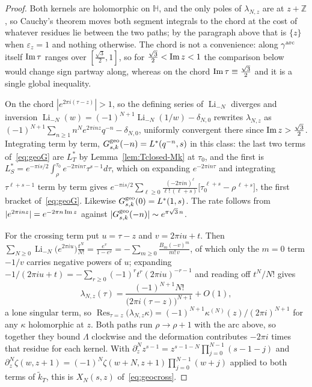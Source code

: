 \documentclass[11pt]{article}
\newcommand{\HH}{\mathbb{H}}
\newcommand{\ZZ}{\mathbb{Z}}
\newcommand{\tk}{\widetilde{k}_T}
\DeclareMathOperator{\Res}{Res}
\DeclareMathOperator{\Li}{Li}
\begin{document}
\begin{proof}
Both kernels are holomorphic on $\HH$, and the only poles of $\lambda_{N,z}$ are at $z+\ZZ$, so
Cauchy's theorem moves both segment integrals to the chord at the cost of whatever residues lie
between the two paths; by the paragraph above that is $\{z\}$ when $\varepsilon_z=1$ and nothing
otherwise. The chord is not a
convenience: along $\gamma^{\rm arc}$ itself ${\rm Im}\,\tau$ ranges over
$[\tfrac{\sqrt3}{2},1]$, so for $\tfrac{\sqrt3}{2}<{\rm Im}\,z<1$ the comparison below would change
sign partway along, whereas on the chord ${\rm Im}\,\tau\equiv\tfrac{\sqrt3}{2}$ and it is a single
global inequality.

On the chord $|e^{2\pi i(\tau-z)}|>1$, so the defining series of $\Li_{-N}$ diverges and inversion
$\Li_{-N}(w)=(-1)^{N+1}\Li_{-N}(1/w)-\delta_{N,0}$ rewrites $\lambda_{N,z}$ as
$(-1)^{N+1}\sum_{n\ge1}n^{N}e^{2\pi inz}q^{-n}-\delta_{N,0}$, uniformly convergent there since
${\rm Im}\,z>\tfrac{\sqrt3}{2}$. Integrating term by term, $G^{\rm geo}_{s,k}(-n)=L^*(q^{-n},s)$ in
this class: the last two terms of~\eqref{eq:geoG} are $L^*_T$ by Lemma~\ref{lem:Tclosed-Mk} at
$\tau_0$, and the first is $L^*_S=e^{-\pi is/2}\int_{\rho}^{\tau_0}e^{-2\pi in\tau}\tau^{s-1}d\tau$,
which on expanding $e^{-2\pi in\tau}$ and integrating $\tau^{\ell+s-1}$ term by term gives
$e^{-\pi is/2}\sum_{\ell\ge0}\frac{(-2\pi in)^{\ell}}{\ell!\,(\ell+s)}
\big[\tau_0^{\,\ell+s}-\rho^{\,\ell+s}\big]$,
the first bracket of~\eqref{eq:geoG}. Likewise $G^{\rm geo}_{s,k}(0)=L^*(1,s)$. The rate follows
from $|e^{2\pi inz}|=e^{-2\pi n\,{\rm Im}\,z}$ against
$|G^{\rm geo}_{s,k}(-n)|\sim e^{\pi\sqrt3\,n}$.

For the crossing term put $u=\tau-z$ and $v=2\pi iu+t$. Then
$\sum_{N\ge0}\Li_{-N}\big(e^{2\pi iu}\big)\tfrac{t^{N}}{N!}=\tfrac{e^{v}}{1-e^{v}}
=-\sum_{m\ge0}\tfrac{B_m(-v)^{m}}{m!\,v}$, of which only the $m=0$ term $-1/v$ carries negative
powers of $u$; expanding $-1/(2\pi iu+t)=-\sum_{r\ge0}(-1)^{r}t^{r}(2\pi iu)^{-r-1}$ and reading
off $t^{N}/N!$ gives
\begin{equation}\label{eq:blockpp}
\lambda_{N,z}(\tau)=\frac{(-1)^{N+1}N!}{\big(2\pi i(\tau-z)\big)^{N+1}}+O(1),
\end{equation}
a lone singular term, so $\Res_{\tau=z}\big(\lambda_{N,z}\kappa\big)
=(-1)^{N+1}\kappa^{(N)}(z)/(2\pi i)^{N+1}$ for any $\kappa$ holomorphic at $z$. Both paths run
$\rho\to\rho+1$ with the arc above, so together they bound $\Lambda$ clockwise and the deformation
contributes $-2\pi i$ times that residue for each kernel. With
$\partial_z^{N}z^{s-1}=z^{s-1-N}\prod_{j=0}^{N-1}(s-1-j)$ and
$\partial_z^{N}\zeta(w,z+1)=(-1)^{N}\zeta(w+N,z+1)\prod_{j=0}^{N-1}(w+j)$ applied to both terms of
$\tk$, this is $X_N(s,z)$ of~\eqref{eq:geocross}.
\end{proof}
\end{document}

